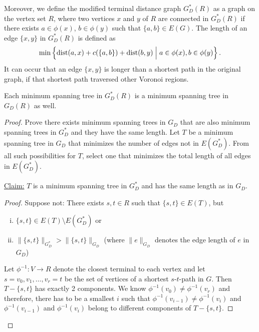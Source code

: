 \documentclass[../skript.tex]{subfiles}
\begin{document}
Moreover, we define the modified terminal distance graph $G_D^*(R)$ as a graph on the vertex set $R$, where two vertices $x$ and $y$ of $R$ are connected in $G_D^*(R)$ if there exists $a \in \phi(x)$, $b \in \phi(y)$ such that $\{ a, b \} \in E(G)$.
The length of an edge $\{ x, y \}$ in $G_D^*(R)$ is defined as
\[
	\min \left\{ \operatorname*{dist}(a, x) + c(\{ a, b\}) + \operatorname*{dist}(b, y) \mathrel{}\middle|\mathrel{} a \in \phi(x), b \in \phi(y) \vphantom{\Big\}} \right\}.
\]
It can occur that an edge $\{x, y\}$ is longer than a shortest path in the original graph, if that shortest path traversed other Voronoi regions.
\begin{lemma} %
\label{thm:70}
Each minimum spanning tree in $G_D^*(R)$ is a minimum spanning tree in $G_D(R)$ as well.
\end{lemma}
\begin{proof}
Prove there exists minimum spanning trees in $G_D$ that are also minimum spanning trees in $G_D^*$ and they have the same length.
Let $T$ be a minimum spanning tree in $G_D$ that minimizes the number of edges not in $E(G_D^*)$. From all such possibilities for $T$, select one that minimizes the total length of all edges in $E(G_D^*)$.

\underline{Claim:} $T$ is a minimum spanning tree in $G_D^*$ and has the same length as in $G_D$.
\begin{proof}
\NoEndMark
Suppose not: There exists $s, t \in R$ such that $\{s, t\} \in E(T)$, but
\begin{enumerate}[(i)]
\item $\{s, t\} \in E(T) \setminus E(G_D^*)$ or
\item $\| \{ s, t \} \|_{G_D^*} > \| \{ s, t \} \|_{G_D}$ (where $\| e \|_{G_D}$ denotes the edge length of $e$ in $G_D$)
\end{enumerate}
Let $\phi^{-1} : V \to R$ denote the closest terminal to each vertex and let $s = v_0, v_1, \ldots, v_r = t$ be the set of vertices of a shortest $s$-$t$-path in $G$. Then $T - \{ s, t\}$ has exactly 2 components. We know $\phi^{-1}(v_0) \neq \phi^{-1}(v_r)$ and therefore, there has to be a smallest $i$ such that $\phi^{-1}(v_{i-1}) \neq \phi^{-1}(v_i)$ and $\phi^{-1}(v_{i-1})$ and $\phi^{-1}(v_i)$ belong to different components of $T - \{ s, t \}$.


\end{proof}
\end{proof}
\end{document}
